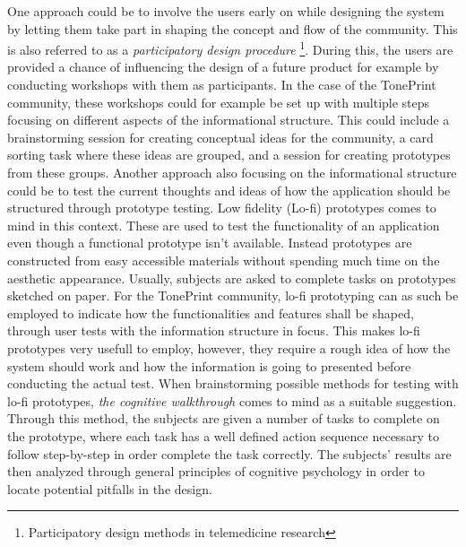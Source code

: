 \noindent
One approach could be to involve the users early on while designing the system by letting them take part in shaping the concept and flow of the community. This is also referred to as a \textit{participatory design procedure} \footnote{Participatory design methods in telemedicine research}. During this, the users are provided a chance of influencing the design of a future product for example by conducting workshops with them as participants. In the case of the TonePrint community, these workshops could for example be set up with multiple steps focusing on different aspects of the informational structure. This could include a brainstorming session for creating conceptual ideas for the community, a card sorting task where these ideas are grouped, and a session for creating prototypes from these groups. Another approach also focusing on the informational structure could be to test the current thoughts and ideas of how the application should be structured through prototype testing. Low fidelity (Lo-fi) prototypes comes to mind in this context. These are used to test the functionality of an application even though a functional prototype isn't available. Instead prototypes are constructed from easy accessible materials without spending much time on the aesthetic appearance. Usually, subjects are asked to complete tasks on prototypes sketched on paper. For the TonePrint community, lo-fi prototyping can as such be employed to indicate how the functionalities and features shall be shaped, through user tests with the information structure in focus. This makes lo-fi prototypes very usefull to employ, however, they require a rough idea of how the system should work and how the information is going to presented before conducting the actual test. When brainstorming possible methods for testing with lo-fi prototypes, \textit{the cognitive walkthrough} comes to mind as a suitable suggestion. Through this method, the subjects are given a number of tasks to complete on the prototype, where each task has a well defined action sequence necessary to follow step-by-step in order complete the task correctly. The subjects' results are then analyzed through general principles of cognitive psychology in order to locate potential pitfalls in the design.\\


